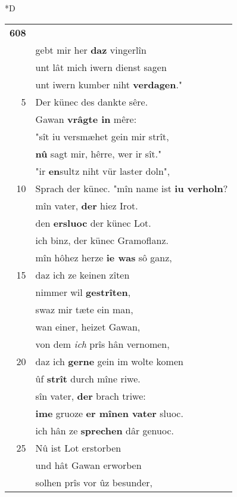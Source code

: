 \documentclass[8pt,a4paper,notitlepage]{article}
\begin{document}
\begin{table}[ht]
\begin{minipage}[t]{0.5\linewidth}
\small
\begin{center}*D
\end{center}
\begin{tabular}{rl}
\textbf{608} & \textit{\begin{large}I\end{large}}ch wil iwer bote sîn.\\ 
 & gebt mir her \textbf{daz} vingerlîn\\ 
 & unt lât mich iwern dienst sagen\\ 
 & unt iwern kumber niht \textbf{verdagen}."\\ 
5 & Der künec des dankte sêre.\\ 
 & Gawan \textbf{vrâgte in} mêre:\\ 
 & "sît iu versmæhet gein mir strît,\\ 
 & \textbf{nû} sagt mir, hêrre, wer ir sît."\\ 
 & "ir \textbf{en}sultz niht vür laster doln",\\ 
10 & Sprach der künec. "mîn name ist \textbf{iu verholn}?\\ 
 & mîn vater, \textbf{der} hiez Irot.\\ 
 & den \textbf{ersluoc} der künec Lot.\\ 
 & ich binz, der künec Gramoflanz.\\ 
 & mîn hôhez herze \textbf{ie was} sô ganz,\\ 
15 & daz ich ze keinen zîten\\ 
 & nimmer wil \textbf{gestrîten},\\ 
 & swaz mir tæte ein man,\\ 
 & wan einer, heizet Gawan,\\ 
 & von dem \textit{ich} prîs hân vernomen,\\ 
20 & daz ich \textbf{gerne} gein im wolte komen\\ 
 & ûf \textbf{strît} durch mîne riwe.\\ 
 & sîn vater, \textbf{der} brach triwe:\\ 
 & \textbf{ime} gruoze \textbf{er mînen vater} sluoc.\\ 
 & ich hân ze \textbf{sprechen} dâr genuoc.\\ 
25 & Nû ist Lot erstorben\\ 
 & und hât Gawan erworben\\ 
 & solhen prîs vor ûz besunder,\\ 

\end{tabular}
\end{minipage}
\end{table}
\end{document}
